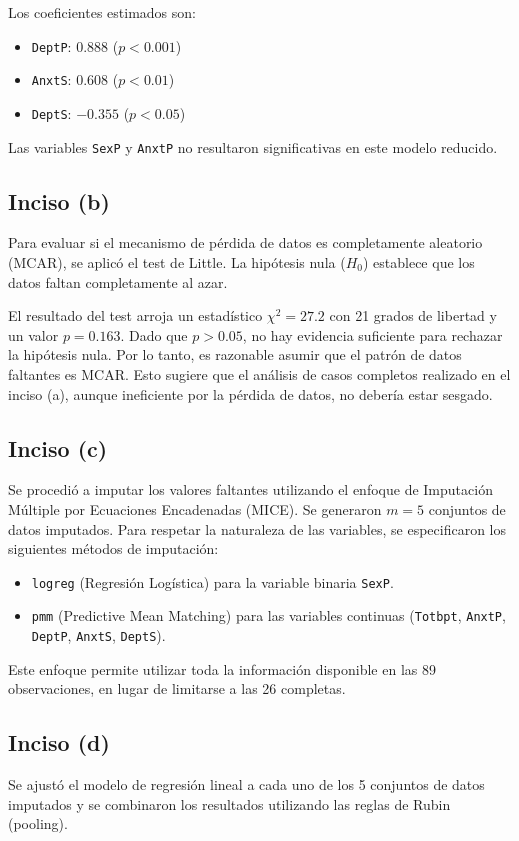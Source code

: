 \documentclass[paper=letter, fontsize=11pt, draft=false]{scrartcl}\usepackage[]{graphicx}\usepackage[]{xcolor}
\numberwithin{equation}{problemcounter} %
\numberwithin{figure}{problemcounter} %
\numberwithin{table}{problemcounter} %
\numberwithin{subsection}{problemcounter}
\begin{document}
Los coeficientes estimados son:
\begin{itemize}
    \item \texttt{DeptP}: $0.888$ ($p < 0.001$)
    \item \texttt{AnxtS}: $0.608$ ($p < 0.01$)
    \item \texttt{DeptS}: $-0.355$ ($p < 0.05$)
\end{itemize}
Las variables \texttt{SexP} y \texttt{AnxtP} no resultaron significativas en este modelo reducido.

\subsection{Inciso (b)}
Para evaluar si el mecanismo de pérdida de datos es completamente aleatorio (MCAR), se aplicó el test de Little.
La hipótesis nula ($H_0$) establece que los datos faltan completamente al azar.

El resultado del test arroja un estadístico $\chi^2 = 27.2$ con 21 grados de libertad y un valor $p = 0.163$.
Dado que $p > 0.05$, no hay evidencia suficiente para rechazar la hipótesis nula. Por lo tanto, es razonable asumir que el patrón de datos faltantes es MCAR. Esto sugiere que el análisis de casos completos realizado en el inciso (a), aunque ineficiente por la pérdida de datos, no debería estar sesgado.

\subsection{Inciso (c)}
Se procedió a imputar los valores faltantes utilizando el enfoque de Imputación Múltiple por Ecuaciones Encadenadas (MICE). Se generaron $m=5$ conjuntos de datos imputados.
Para respetar la naturaleza de las variables, se especificaron los siguientes métodos de imputación:
\begin{itemize}
    \item \texttt{logreg} (Regresión Logística) para la variable binaria \texttt{SexP}.
    \item \texttt{pmm} (Predictive Mean Matching) para las variables continuas (\texttt{Totbpt}, \texttt{AnxtP}, \texttt{DeptP}, \texttt{AnxtS}, \texttt{DeptS}).
\end{itemize}
Este enfoque permite utilizar toda la información disponible en las 89 observaciones, en lugar de limitarse a las 26 completas.

\subsection{Inciso (d)}
Se ajustó el modelo de regresión lineal a cada uno de los 5 conjuntos de datos imputados y se combinaron los resultados utilizando las reglas de Rubin (pooling).
\end{document}
